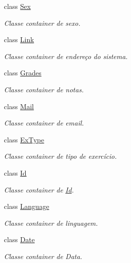 \begin{DoxyCompactItemize}
class \hyperlink{classELO_1_1BaseUnit_1_1Sex}{Sex}
\begin{DoxyCompactList}\small\item\em Classe container de sexo. \end{DoxyCompactList}\item 
class \hyperlink{classELO_1_1BaseUnit_1_1Link}{Link}
\begin{DoxyCompactList}\small\item\em Classe container de endereço do sistema. \end{DoxyCompactList}\item 
class \hyperlink{classELO_1_1BaseUnit_1_1Grades}{Grades}
\begin{DoxyCompactList}\small\item\em Classe container de notas. \end{DoxyCompactList}\item 
class \hyperlink{classELO_1_1BaseUnit_1_1Mail}{Mail}
\begin{DoxyCompactList}\small\item\em Classe container de email. \end{DoxyCompactList}\item 
class \hyperlink{classELO_1_1BaseUnit_1_1ExType}{Ex\-Type}
\begin{DoxyCompactList}\small\item\em Classe container de tipo de exercício. \end{DoxyCompactList}\item 
class \hyperlink{classELO_1_1BaseUnit_1_1Id}{Id}
\begin{DoxyCompactList}\small\item\em Classe container de \hyperlink{classELO_1_1BaseUnit_1_1Id}{Id}. \end{DoxyCompactList}\item 
class \hyperlink{classELO_1_1BaseUnit_1_1Language}{Language}
\begin{DoxyCompactList}\small\item\em Classe container de linguagem. \end{DoxyCompactList}\item 
class \hyperlink{classELO_1_1BaseUnit_1_1Date}{Date}
\begin{DoxyCompactList}\small\item\em Classe container de Data. \end{DoxyCompactList}\end{DoxyCompactItemize}
